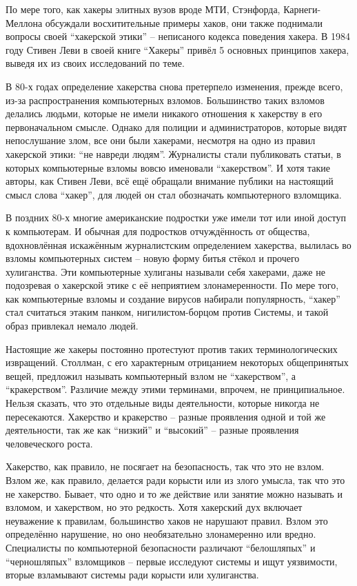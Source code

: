 По мере того, как хакеры элитных вузов вроде МТИ, Стэнфорда, Карнеги-Меллона обсуждали восхитительные примеры хаков, они также поднимали вопросы своей ``хакерской этики'' -- неписаного кодекса поведения хакера. В 1984 году Стивен Леви в своей книге ``Хакеры'' привёл 5 основных принципов хакера, выведя их из своих исследований по теме.

В 80-х годах определение хакерства снова претерпело изменения, прежде всего, из-за распространения компьютерных взломов. Большинство таких взломов делались людьми, которые не имели никакого отношения к хакерству в его первоначальном смысле. Однако для полиции и администраторов, которые видят непослушание злом, все они были хакерами, несмотря на одно из правил хакерской этики: ``не навреди людям''. Журналисты стали публиковать статьи, в которых компьютерные взломы вовсю именовали ``хакерством''. И хотя такие авторы, как Стивен Леви, всё ещё обращали внимание публики на настоящий смысл слова ``хакер'', для людей он стал обозначать компьютерного взломщика.

В поздних 80-х многие американские подростки уже имели тот или иной доступ к компьютерам. И обычная для подростков отчуждённость от общества, вдохновлённая искажённым журналистским определением хакерства, вылилась во взломы компьютерных систем -- новую форму битья стёкол и прочего хулиганства. Эти компьютерные хулиганы называли себя хакерами, даже не подозревая о хакерской этике с её неприятием злонамеренности. По мере того, как компьютерные взломы и создание вирусов набирали популярность, ``хакер'' стал считаться этаким панком, нигилистом-борцом против Системы, и такой образ привлекал немало людей.

Настоящие же хакеры постоянно протестуют против таких терминологических извращений. Столлман, с его характерным отрицанием некоторых общепринятых вещей, предложил называть компьютерный взлом не ``хакерством'', а ``кракерством''. Различие между этими терминами, впрочем, не принципиальное. Нельзя сказать, что это отдельные виды деятельности, которые никогда не пересекаются. Хакерство и кракерство -- разные проявления одной и той же деятельности, так же как ``низкий'' и ``высокий'' -- разные проявления человеческого роста.

Хакерство, как правило, не посягает на безопасность, так что это не взлом. Взлом же, как правило, делается ради корысти или из злого умысла, так что это не хакерство. Бывает, что одно и то же действие или занятие можно называть и взломом, и хакерством, но это редкость. Хотя хакерский дух включает неуважение к правилам, большинство хаков не нарушают правил. Взлом это определённо нарушение, но оно необязательно злонамеренно или вредно. Специалисты по компьютерной безопасности различают ``белошляпых'' и ``черношляпых'' взломщиков -- первые исследуют системы и ищут уязвимости, вторые взламывают системы ради корысти или хулиганства.

